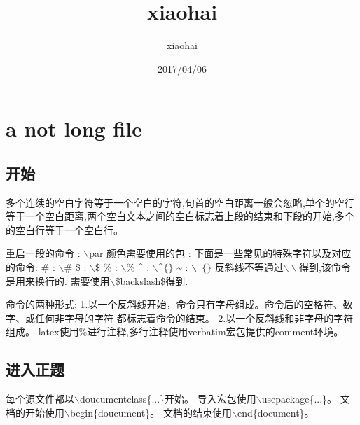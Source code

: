 \documentclass[11pt,a4paper,UTF8,openany]{ctexbook}
\author{xiaohai}
\date{2017/04/06}
\title{xiaohai}
\begin{document}
\maketitle
\tableofcontents

\chapter{a not long file}
\section{开始}
多个连续的空白字符等于一个空白的字符,句首的空白距离一般会忽略,单个的空行
等于一个空白距离,两个空白文本之间的空白标志着上段的结束和下段的开始,多个
的空白行等于一个空白行。

\noindent 重启一段的命令{} : {\color{red}$\backslash$par}\newline
颜色需要使用的包 : {\color{red}{xcolor}}\newline
下面是一些常见的特殊字符以及对应的命令:\newline
\# : {\color{red}$\backslash\#$}\newline
\$ : {\color{red}$\backslash\$$}\newline
\% : {\color{red}$\backslash\%$}\newline
\^{} : {\color{red}$\backslash$\^{}$\{\}$}\newline
\~{} : {\color{red}$\backslash$~$\{\}$}\newline
反斜线不等通过$\backslash\backslash$得到,该命令是用来换行的.
需要使用$\backslash$\$backslash\$得到.\newline

命令的两种形式:\newline
1.以一个反斜线开始，命令只有字母组成。命令后的空格符、数字、或任何非字母的字符
都标志着命令的结束。\newline
2.以一个反斜线和非字母的字符组成。\newline
latex使用\%进行注释,多行注释使用verbatim宏包提供的comment环境。\newline

\section{进入正题}
每个源文件都以$\backslash$doucumentclass\{...\}开始。\newline
导入宏包使用$\backslash$usepackage\{...\}。\newline
文档的开始使用$\backslash$begin\{doucument\}。\newline
文档的结束使用$\backslash$end\{document\}。\newline
\end{document}
